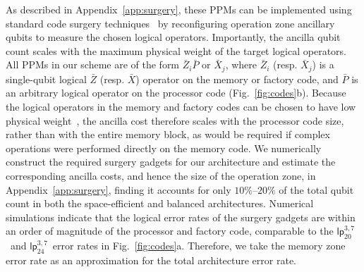 \documentclass[reprint,twocolumn,secnumarabic,amssymb, aps, prx]{revtex4-2}
\newcommand{\lpmemlarge}{\mbox{$\mathsf{lp}_{24}^{3, 7}$}}
\newcommand{\lpmemmed}{\mbox{$\mathsf{lp}^{3, 7}_{20}$}}
\begin{document}
As described in Appendix~\ref{app:surgery}, these PPMs can be implemented using standard code surgery techniques~\cite{cross2024improved, williamson2024low, swaroop2024universal} by reconfiguring operation zone ancillary qubits to measure the chosen logical operators. Importantly, the ancilla qubit count scales with the maximum physical weight of the target logical operators. All PPMs in our scheme are of the form $\bar{Z}_i\bar{P}$ or $\bar{X}_j$, where $\bar{Z}_i$ (resp. $\bar{X}_j$) is a single-qubit logical $\bar{Z}$ (resp. $\bar{X}$) operator on the memory or factory code, and $\bar{P}$ is an arbitrary logical operator on the processor code (Fig.~\ref{fig:codes}b). Because the logical operators in the memory and factory codes can be chosen to have low physical weight~\cite{zheng2026high}, the ancilla cost therefore scales with the processor code size, rather than with the entire memory block, as would be required if complex operations were performed directly on the memory code. We numerically construct the required surgery gadgets for our architecture and estimate the corresponding ancilla costs, and hence the size of the operation zone, in Appendix~\ref{app:surgery}, finding it accounts for only $10\%$--$20\%$ of the total qubit count in both the space-efficient and balanced architectures. Numerical simulations indicate that the logical error rates of the surgery gadgets are within an order of magnitude of the processor and factory code, comparable to the \lpmemmed\ and \lpmemlarge\ error rates in Fig.~\ref{fig:codes}a. Therefore, we take the memory zone error rate as an approximation for the total architecture error rate.
\end{document}
